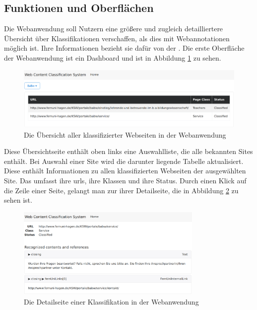 \subsection{Funktionen und Oberflächen}
    \label{section:solutionDetailsWebAppFunctions}
    Die Webanwendung soll Nutzern eine größere und zugleich detailliertere
    Übersicht über Klassifikationen verschaffen,
    als dies mit Webannotationen möglich ist.
    Ihre Informationen bezieht sie dafür von der
    {\classificationStorageAPI}.
    Die erste Oberfläche der Webanwendung ist ein Dashboard
    und ist in Abbildung \ref{image:webAppDashboard} zu sehen.

    \begin{figure}[htb]
        \centering
        \includegraphics[width=\textwidth]{../resources/web-app/dashboard.png}
        \caption{Die Übersicht aller klassifizierter Webseiten in der Webanwendung}
        \label{image:webAppDashboard}
    \end{figure}

    Diese Übersichtseite enthält oben links eine Auswahlliste, die alle bekannten Sites enthält.
    Bei Auswahl einer Site wird die darunter liegende Tabelle aktualisiert.
    Diese enthält Informationen zu allen klassifizierten Webseiten der ausgewählten Site.
    Das umfasst ihre \glspl{url}, ihre Klassen und ihre Status.
    Durch einen Klick auf die Zeile einer Seite,
    gelangt man zur ihrer Detailseite,
    die in Abbildung \ref{image:webAppDetailPage} zu sehen ist.

    \begin{figure}[htb]
        \centering
        \includegraphics[width=0.8\textwidth]{../resources/web-app/detail-page.png}
        \caption{Die Detailseite einer Klassifikation in der Webanwendung}
        \label{image:webAppDetailPage}
    \end{figure}

